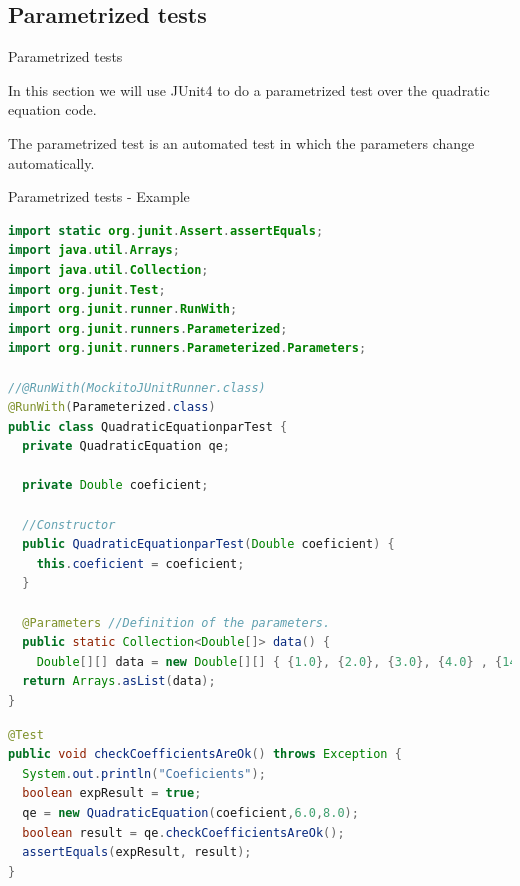 \documentclass[11pt, xcolor=svgnames]{beamer}
\begin{document}
\subsection{Parametrized tests}


\begin{frame}{Parametrized tests}

In this section we will use JUnit4 to do a parametrized test over the quadratic equation code.

The parametrized test is an automated test in which the parameters change automatically.

\end{frame}


\begin{frame}[fragile]{Parametrized tests - Example}
\begin{lstlisting}[language=Java,basicstyle=\tiny]
import static org.junit.Assert.assertEquals;
import java.util.Arrays;
import java.util.Collection;
import org.junit.Test;
import org.junit.runner.RunWith;
import org.junit.runners.Parameterized;
import org.junit.runners.Parameterized.Parameters;

//@RunWith(MockitoJUnitRunner.class)
@RunWith(Parameterized.class)
public class QuadraticEquationparTest {
  private QuadraticEquation qe;

  private Double coeficient;

  //Constructor
  public QuadraticEquationparTest(Double coeficient) {
    this.coeficient = coeficient;
  }

  @Parameters //Definition of the parameters.
  public static Collection<Double[]> data() {
    Double[][] data = new Double[][] { {1.0}, {2.0}, {3.0}, {4.0} , {14.0} };
  return Arrays.asList(data);
}
\end{lstlisting}
\end{frame}



\begin{frame}[fragile]
\begin{lstlisting}[language=Java,basicstyle=\tiny]
@Test
public void checkCoefficientsAreOk() throws Exception {
  System.out.println("Coeficients");
  boolean expResult = true;
  qe = new QuadraticEquation(coeficient,6.0,8.0);
  boolean result = qe.checkCoefficientsAreOk();
  assertEquals(expResult, result);
}
\end{lstlisting}
\end{frame}
\end{document}
